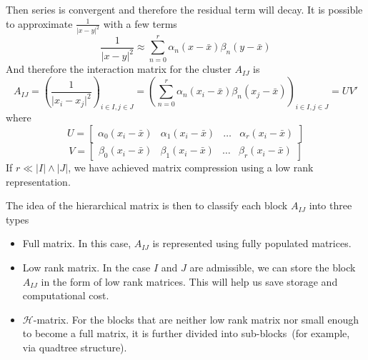 \documentclass[3p,,preprint,12pt]{elsarticle}
\theoremstyle{definition}
\begin{document}
Then series is convergent and therefore the residual term will decay. It is possible to approximate $\frac{1}{{|x - y{|^2}}}$ with a few terms
\begin{equation}
	\frac{1}{{|x - y{|^2}}} \approx \sum_{n=0}^r \alpha_n(x-\bar x)\beta_n(y-\bar x)
\end{equation}
And therefore the interaction matrix for the cluster $A_{IJ}$ is 
\begin{equation}
	A_{IJ} = \left(\frac{1}{{|x_i - x_j{|^2}}}\right)_{i\in I, j\in J} =\left( \sum_{n=0}^r \alpha_n(x_i-\bar x)\beta_n(x_j-\bar x)\right)_{i\in I, j\in J} = UV'
\end{equation}
where
\begin{equation}
	U = \begin{bmatrix}
		\alpha_0(x_i-\bar x)& \alpha_1(x_i-\bar x)&\ldots & \alpha_r(x_i-\bar x)
	\end{bmatrix}
\end{equation}
\begin{equation}
	V = \begin{bmatrix}
		\beta_0(x_i-\bar x)& \beta_1(x_i-\bar x)&\ldots & \beta_r(x_i-\bar x)
	\end{bmatrix}
\end{equation}
If $r\ll |I|\wedge |J|$, we have achieved matrix compression using a low rank representation. 

The idea of the hierarchical matrix is then to classify each block $A_{IJ}$ into three types
\begin{itemize}
\item Full matrix. In this case, $A_{IJ}$ is represented using fully populated matrices.
\item Low rank matrix. In the case $I$ and $J$ are admissible, we can store the block $A_{IJ}$ in the form of low rank matrices. This will help us save storage and computational cost.
	\item $\mathcal{H}$-matrix. For the blocks that are neither low rank matrix nor small enough to become a full matrix, it is further divided into sub-blocks~(for example, via quadtree structure). 
\end{itemize}
\end{document}
